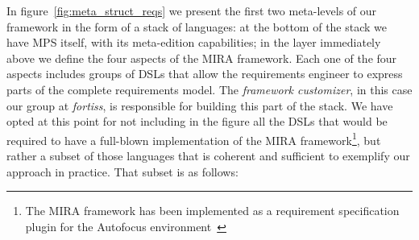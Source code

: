 In figure~\ref{fig:meta_struct_reqs} we present the first two meta-levels of our
framework in the form of a stack of languages: at the bottom of the stack we
have MPS itself, with its meta-edition capabilities; in the layer immediately
above we define the four aspects of the MIRA framework. Each one of the four
aspects includes groups of DSLs that allow the requirements engineer to express
parts of the complete requirements model. The \emph{framework customizer}, in
this case our group at \emph{fortiss}, is responsible for building this part of
the stack. We have opted at this point for not including in the figure all the
DSLs that would be required to have a full-blown implementation of the MIRA
framework\footnote{The MIRA framework has been implemented as a requirement
specification plugin for the Autofocus environment~\cite{AF315}}, but rather a
subset of those languages that is coherent and sufficient to exemplify our
approach in practice. That subset is as follows:

